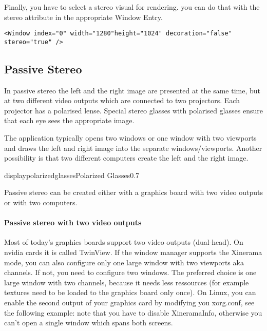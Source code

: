 Finally, you have to select a stereo visual for rendering. you can do that with the stereo attribute in the appropriate Window Entry.

\begin{samepage}
\small \begin{verbatim}
<Window index="0" width="1280"height="1024" decoration="false" stereo="true" />	
\end{verbatim} \normalsize
\end{samepage}


\subsection{Passive Stereo}

In passive stereo the left and the right image are presented at the
same time, but at two different video outputs which are connected to
two projectors. Each projector has a polarised lense. 
Special stereo glasses with polarised glasses ensure that each eye
sees the appropriate image.

The application
typically opens two windows or one window with two viewports and
draws the left and right image into the separate windows/viewports.
Another possibility is that two different computers create the left
and the right image.

	  
\begin{covimg}{display}{polarizedglasses}{Polarized Glasses}{0.7}\end{covimg}

Passive stereo can be created either with a graphics board with two
video outputs or with two computers.

\paragraph{Passive stereo with two video outputs}
Most of today's graphics boards support two video
outputs (dual-head). On nvidia cards it is called TwinView. 
If the window manager supports the Xinerama mode, you can also configure
only one large window with two viewports aka channels. If not, you need to configure
two windows. The preferred choice is one large window with two
channels, because it needs less ressources (for example textures need
to be loaded to the graphics board only once).
On Linux, you can enable the second output of your graphics card by modifying you xorg.conf, see the following example:
note that you have to disable XineramaInfo, otherwise you can't open a single window which spans both screens.

